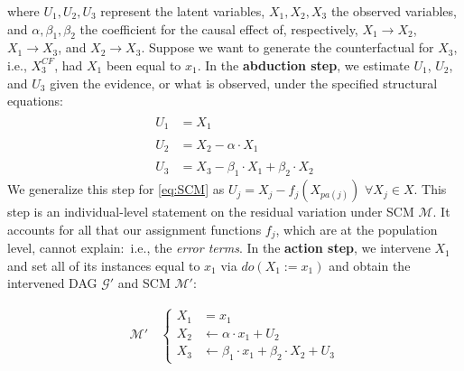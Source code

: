 \noindent
where $U_1, U_2, U_3$ represent the latent variables, $X_1, X_2, X_3$ the observed variables, and $\alpha, \beta_1, \beta_2$ the coefficient for the causal effect of, respectively, $X_1 \rightarrow X_2$,  $X_1 \rightarrow X_3$, and $X_2 \rightarrow X_3$. 
Suppose we want to generate the counterfactual for $X_3$, i.e., $X_3^{CF}$, had $X_1$ been equal to $x_1$. 
In the \textbf{abduction step}, we estimate $U_1$, $U_2$, and $U_3$ given the evidence, or what is observed, under the specified structural equations:
%
\begin{align*}
    \hat{U}_1 & = X_1 \\
    \hat{U}_2 & = X_2 - \alpha \cdot X_1 \\
    \hat{U}_3 & = X_3 - \beta_1 \cdot X_1 + \beta_2 \cdot X_2
\end{align*}
%
We generalize this step for \eqref{eq:SCM} as $U_j = X_j - f_j(X_{pa(j)})$ $\forall X_j \in X$. 
This step is an individual-level statement on the residual variation under SCM $\mathcal{M}$. 
It accounts for all that our assignment functions $f_j$, which are at the population level, cannot explain:~i.e., the \textit{error terms}. 
In the \textbf{action step}, we intervene $X_1$ and set all of its instances equal to $x_1$ via $do(X_1:=x_1)$ and obtain the intervened DAG $\mathcal{G}'$ and SCM $\mathcal{M}'$:

%
\begin{minipage}{.45\linewidth}
\begin{figure}[H]
\centering
\end{figure}
\end{minipage}
\begin{minipage}{.45\linewidth}
\begin{align*}
\mathcal{M}' \, & 
\begin{cases}
    X_1 & = x_1 \\
    X_2 & \leftarrow \alpha \cdot x_1  + U_2 \\
    X_3 & \leftarrow \beta_1 \cdot x_1 + \beta_2 \cdot X_2 + U_3
\end{cases}
\end{align*}
\end{minipage}
%
\medskip

